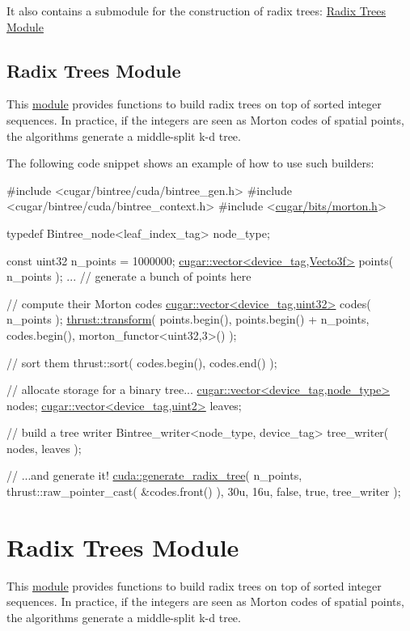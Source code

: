 It also contains a submodule for the construction of radix trees\+: \hyperlink{radixtree_page}{Radix Trees Module} \hypertarget{radixtree_page}{}\subsection{Radix Trees Module}\label{radixtree_page}
This \hyperlink{group__radixtree}{module} provides functions to build radix trees on top of sorted integer sequences. In practice, if the integers are seen as Morton codes of spatial points, the algorithms generate a middle-\/split k-\/d tree.

The following code snippet shows an example of how to use such builders\+:


\begin{DoxyCode}
\textcolor{preprocessor}{#include <cugar/bintree/cuda/bintree\_gen.h>}
\textcolor{preprocessor}{#include <cugar/bintree/cuda/bintree\_context.h>}
\textcolor{preprocessor}{#include <\hyperlink{morton_8h}{cugar/bits/morton.h}>}

\textcolor{keyword}{typedef} Bintree\_node<leaf\_index\_tag> node\_type;

\textcolor{keyword}{const} uint32 n\_points = 1000000;
\hyperlink{structcugar_1_1vector}{cugar::vector<device\_tag,Vecto3f>} points( n\_points );
... \textcolor{comment}{// generate a bunch of points here}

\textcolor{comment}{// compute their Morton codes}
\hyperlink{structcugar_1_1vector}{cugar::vector<device\_tag,uint32>} codes( n\_points );
\hyperlink{group___primitives_gab584ee91ed39f9b1fec5aa0e7a0284a4}{thrust::transform}(
    points.begin(),
    points.begin() + n\_points,
    codes.begin(),
    morton\_functor<uint32,3>() );

\textcolor{comment}{// sort them}
thrust::sort( codes.begin(), codes.end() );

\textcolor{comment}{// allocate storage for a binary tree...}
\hyperlink{structcugar_1_1vector}{cugar::vector<device\_tag,node\_type>} nodes;
\hyperlink{structcugar_1_1vector}{cugar::vector<device\_tag,uint2>}     leaves;

\textcolor{comment}{// build a tree writer}
Bintree\_writer<node\_type, device\_tag> tree\_writer( nodes, leaves );

\textcolor{comment}{// ...and generate it!}
\hyperlink{group__radixtree_gafb888a81f085548c89a282181d74649a}{cuda::generate\_radix\_tree}(
    n\_points,
    thrust::raw\_pointer\_cast( &codes.front() ),
    30u,
    16u,
    \textcolor{keyword}{false},
    \textcolor{keyword}{true},
    tree\_writer );
\end{DoxyCode}
 \hypertarget{radixtree_page}{}\section{Radix Trees Module}\label{radixtree_page}
This \hyperlink{group__radixtree}{module} provides functions to build radix trees on top of sorted integer sequences. In practice, if the integers are seen as Morton codes of spatial points, the algorithms generate a middle-\/split k-\/d tree.


